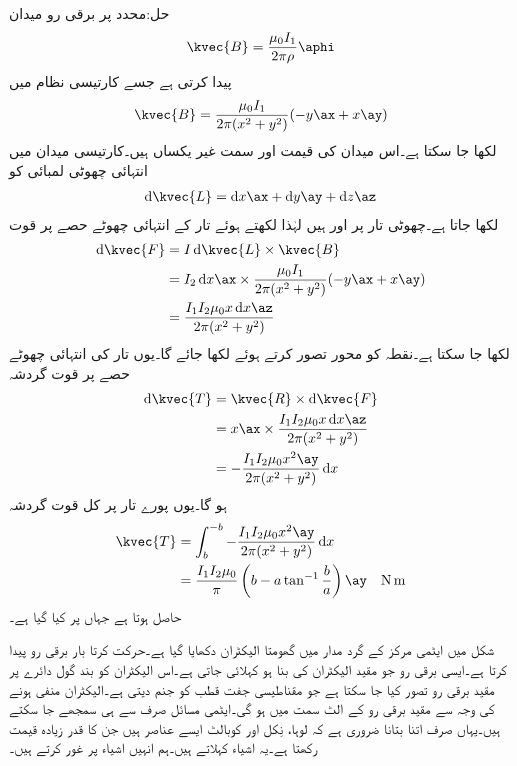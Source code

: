 حل:محدد  پر برقی رو میدان 
\begin{align*}
\kvec{B}=\frac{\mu_0 I_1}{2\pi \rho}\aphi
\end{align*}
پیدا کرتی ہے جسے کارتیسی نظام میں
\begin{align*}
\kvec{B}=\frac{\mu_0 I_1}{2\pi(x^2+y^2)} (-y\ax+x\ay)
\end{align*}
لکھا جا سکتا ہے۔اس میدان کی قیمت اور سمت غیر یکساں ہیں۔کارتیسی میدان میں انتہائی چھوٹی لمبائی کو
\begin{align*}
\dif \kvec{L}=\dif x \ax+\dif y \ay +\dif z \az
\end{align*}
لکھا جاتا ہے۔چھوٹی تار پر  اور  ہیں لہٰذا  لکھتے ہوئے تار کے انتہائی چھوٹے حصے پر قوت
\begin{align*}
\dif \kvec{F}&=I \dif \kvec{L} \times \kvec{B}\\
&=I_2 \dif x \ax \times \frac{\mu_0 I_1}{2\pi(x^2+y^2)} (-y\ax+x\ay)\\
&=\frac{I_1 I_2 \mu_0 x \dif x \az}{2\pi (x^2+y^2)}
\end{align*}
لکھا جا سکتا ہے۔نقطہ  کو محور تصور کرتے ہوئے  لکھا جائے گا۔یوں تار کی انتہائی چھوٹے حصے پر قوت گردشہ
\begin{align*}
\dif \kvec{T}&=\kvec{R} \times \dif \kvec{F}\\
&=x\ax \times \frac{I_1 I_2 \mu_0 x \dif x \az}{2\pi (x^2+y^2)}\\
&=-\frac{I_1 I_2 \mu_0 x^2 \ay}{2\pi (x^2+y^2)} \dif x
\end{align*}
ہو گا۔یوں پورے تار پر کل قوت گردشہ
\begin{align*}
\kvec{T}&=\int_{b}^{-b}-\frac{I_1 I_2 \mu_0 x^2 \ay}{2\pi (x^2+y^2)} \dif x\\
&=\frac{I_1 I_2 \mu_0}{\pi} \left(b-a \tan^{-1} \frac{b}{a}\right)\ay \quad \si{\newton \meter}
\end{align*}
حاصل ہوتا ہے جہاں  پر کیا گیا ہے۔

شکل  میں ایٹمی مرکز کے گرد مدار میں گھومتا الیکٹران دکھایا گیا ہے۔حرکت کرتا بار برقی رو پیدا کرتا ہے۔ایسی برقی رو جو مقید الیکٹران کی بنا ہو    کہلائی جاتی  ہے۔اس الیکٹران کو بند گول دائرے پر مقید برقی رو تصور کیا جا سکتا ہے جو مقناطیسی جفت قطب  کو جنم دیتی ہے۔الیکٹران منفی ہونے کی وجہ سے   مقید برقی  رو   کے الٹ سمت میں ہو گی۔ایٹمی مسائل صرف  سے ہی سمجھے جا سکتے ہیں۔یہاں صرف اتنا بتانا ضروری ہے کہ لوہا، نِکل اور کوبالٹ  ایسے  عناصر ہیں جن کا   قدر زیادہ قیمت رکھتا ہے۔یہ اشیاء  کہلاتے ہیں۔ہم انہیں اشیاء پر غور کرتے ہیں۔

